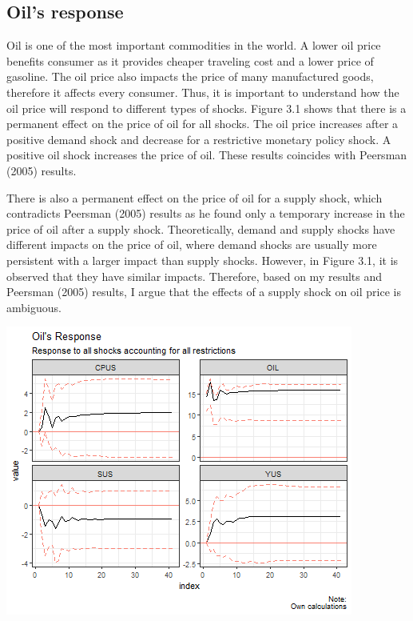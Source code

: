 \documentclass[11pt,preprint, authoryear]{elsarticle}
\let\origfigure\figure
\let\endorigfigure\endfigure
\renewenvironment{figure}[1][2] {
    \expandafter\origfigure\expandafter[H]
} {
    \endorigfigure
}
\numberwithin{equation}{section}
\numberwithin{figure}{section}
\numberwithin{table}{section}
\begin{document}
\hypertarget{oils-response}{%
\subsection{Oil's response}\label{oils-response}}

Oil is one of the most important commodities in the world. A lower oil
price benefits consumer as it provides cheaper traveling cost and a
lower price of gasoline. The oil price also impacts the price of many
manufactured goods, therefore it affects every consumer. Thus, it is
important to understand how the oil price will respond to different
types of shocks. Figure 3.1 shows that there is a permanent effect on
the price of oil for all shocks. The oil price increases after a
positive demand shock and decrease for a restrictive monetary policy
shock. A positive oil shock increases the price of oil. These results
coincides with Peersman (2005) results.

There is also a permanent effect on the price of oil for a supply shock,
which contradicts Peersman (2005) results as he found only a temporary
increase in the price of oil after a supply shock. Theoretically, demand
and supply shocks have different impacts on the price of oil, where
demand shocks are usually more persistent with a larger impact than
supply shocks. However, in Figure 3.1, it is observed that they have
similar impacts. Therefore, based on my results and Peersman (2005)
results, I argue that the effects of a supply shock on oil price is
ambiguous.

\begin{figure}[H]

{\centering \includegraphics{replication_files/figure-latex/Figure2-1} 

}

\caption{Response of Oil Price\label{Figure2}}\label{fig:Figure2}
\end{figure}
\end{document}
